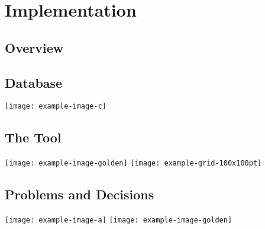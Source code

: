 \chapter{Implementation}
\section{Overview}
\lipsum[5-6]
\section{Database}
\lipsum[8-9]
\noindent\texttt{[image: example-image-c]}
\lipsum[10] 
\section{The Tool}
\lipsum[10-11]
\texttt{[image: example-image-golden]}\qquad
\texttt{[image: example-grid-100x100pt]}
\lipsum[12]
\section{Problems and Decisions}
\lipsum[3-4]
\noindent\texttt{[image: example-image-a]}\qquad
\texttt{[image: example-image-golden]}\qquad